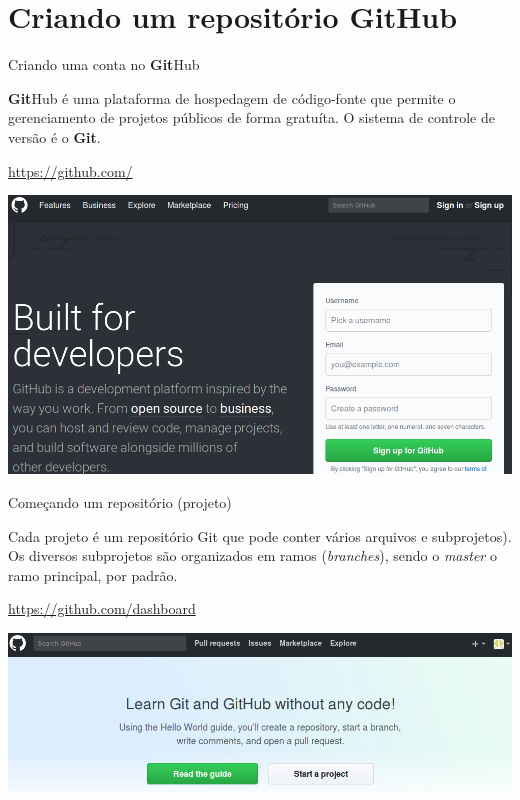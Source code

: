 \documentclass{beamer}
\begin{document}
\section{Criando um repositório {\bf Git}Hub}
\begin{frame}{Criando uma conta no {\bf Git}Hub}
  \begin{center}
    {\bf Git}Hub é uma plataforma de hospedagem de código-fonte que permite o gerenciamento de projetos públicos de forma gratuíta. O sistema de controle de versão é o {\bf Git}.
  \end{center}
  \begin{center}
    \url{https://github.com/}
    
    \includegraphics[scale=0.25]{./figs/SignUp_GitHub.png}
  \end{center}
\end{frame}

\begin{frame}{Começando um repositório (projeto)}
  \begin{center}
    Cada projeto é um repositório Git que pode conter vários arquivos e subprojetos). Os diversos subprojetos são organizados em ramos ({\it branches}), sendo o {\it master} o ramo principal, por padrão.
  \end{center}
  \begin{center}
    \url{https://github.com/dashboard}
    
    \includegraphics[scale=0.25]{./figs/Start_a_project_GitHub.png}
  \end{center}
\end{frame}
\end{document}
